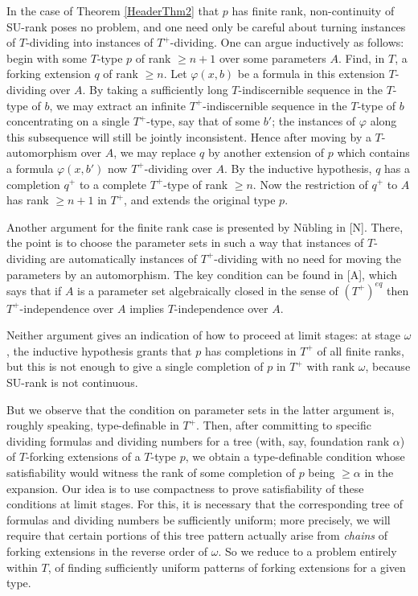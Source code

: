 \documentclass{article}
\theoremstyle{remark}
\theoremstyle{definition}
\begin{document}
In the case of Theorem \ref{HeaderThm2} that $p$ has finite rank, non-continuity of SU-rank poses no problem, and one need only be careful about turning instances of $T$-dividing into instances of $T^+$-dividing. One can argue inductively as follows: begin with some $T$-type $p$ of rank $\geq n+1$ over some parameters $A$. Find, in $T$, a forking extension $q$ of rank $\geq n$. Let $\varphi(x,b)$ be a formula in this extension $T$-dividing over $A$. By taking a sufficiently long $T$-indiscernible sequence in the $T$-type of $b$, we may extract an infinite $T^+$-indiscernible sequence in the $T$-type of $b$ concentrating on a single $T^+$-type, say that of some $b'$; the instances of $\varphi$ along this subsequence will still be jointly inconsistent. Hence after moving by a $T$-automorphism over $A$, we may replace $q$ by another extension of $p$ which contains a formula $\varphi(x,b')$ now $T^+$-dividing over $A$. By the inductive hypothesis, $q$ has a completion $q^+$ to a complete $T^+$-type of rank $\geq n$. Now the restriction of $q^+$ to $A$ has rank $\geq n+1$ in $T^+$, and extends the original type $p$.

Another argument for the finite rank case is presented by N\"ubling in [N]. There, the point is to choose the parameter sets in such a way that instances of $T$-dividing are automatically instances of $T^+$-dividing with no need for moving the parameters by an automorphism. The key condition can be found in [A], which says that if $A$ is a parameter set algebraically closed in the sense of $(T^+)^{eq}$ then $T^+$-independence over $A$ implies $T$-independence over $A$.

Neither argument gives an indication of how to proceed at limit stages: at stage $\omega$, the inductive hypothesis grants that $p$ has completions in $T^+$ of all finite ranks, but this is not enough to give a single completion of $p$ in $T^+$ with rank $\omega$, because SU-rank is not continuous.

But we observe that the condition on parameter sets in the latter argument is, roughly speaking, type-definable in $T^+$. Then, after committing to specific dividing formulas and dividing numbers for a tree (with, say, foundation rank $\alpha$) of $T$-forking extensions of a $T$-type $p$, we obtain a type-definable condition whose satisfiability would witness the rank of some completion of $p$ being $\geq \alpha$ in the expansion. Our idea is to use compactness to prove satisfiability of these conditions at limit stages. For this, it is necessary that the corresponding tree of formulas and dividing numbers be sufficiently uniform; more precisely, we will require that certain portions of this tree pattern actually arise from \textit{chains} of forking extensions in the reverse order of $\omega$. So we reduce to a problem entirely within $T$, of finding sufficiently uniform patterns of forking extensions for a given type.
\end{document}
